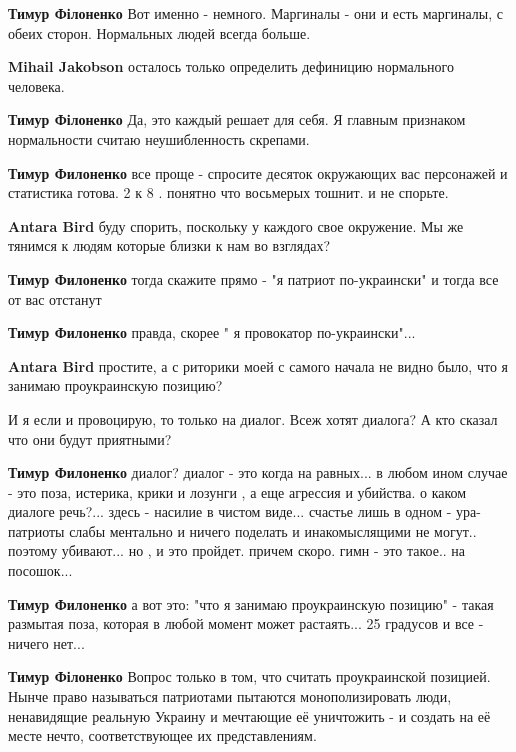 \begin{itemize}
\begin{itemize}
\textbf{Тимур Філоненко} Вот именно - немного.
Маргиналы - они и есть маргиналы, с обеих сторон.
Нормальных людей всегда больше.

\textbf{Mihail Jakobson} осталось только определить дефиницию нормального человека.

\textbf{Тимур Філоненко} Да, это каждый решает для себя.
Я главным признаком нормальности считаю неушибленность скрепами.

\textbf{Тимур Филоненко} все проще - спросите десяток окружающих вас персонажей и статистика готова. 2 к 8 . понятно что восьмерых тошнит. и не спорьте.

\textbf{Antara Bird} буду спорить, поскольку у каждого свое окружение. Мы же тянимся к людям которые близки к нам во взглядах?

\textbf{Тимур Филоненко} тогда скажите прямо - "я патриот по-украински" и тогда все от вас отстанут

\textbf{Тимур Филоненко} правда, скорее " я провокатор по-украински"...

\textbf{Antara Bird} простите, а с риторики моей с самого начала не видно было, что я занимаю проукраинскую позицию?

И я если и провоцирую, то только на диалог. Всеж хотят диалога? А кто сказал что они будут приятными?

\textbf{Тимур Филоненко} диалог? диалог - это когда на равных... в любом ином случае - это поза, истерика, крики и лозунги , а еще агрессия и убийства. о каком диалоге речь?... здесь - насилие в чистом виде... счастье лишь в одном - ура-патриоты слабы ментально и ничего поделать и инакомыслящими не могут.. поэтому убивают... но , и это пройдет. причем скоро. гимн - это такое.. на посошок...

\textbf{Тимур Филоненко} а вот это: "что я занимаю проукраинскую позицию" - такая размытая поза, которая в любой момент может растаять... 25 градусов и все - ничего нет...

\textbf{Тимур Філоненко} Вопрос только в том, что считать проукраинской позицией.
Нынче право называться патриотами пытаются монополизировать люди, ненавидящие реальную Украину и мечтающие её уничтожить - и создать на её месте нечто, соответствующее их представлениям.


\end{itemize}
\end{itemize}
